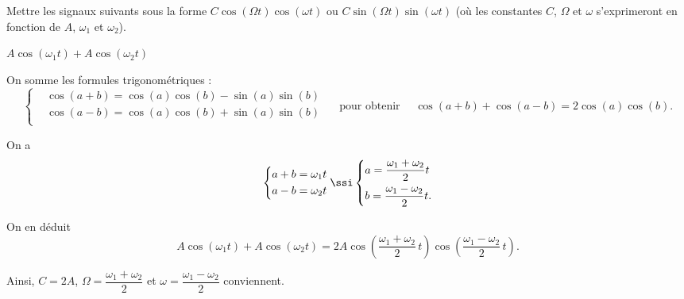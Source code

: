 Mettre les signaux suivants sous la forme $C\cos(\Omega t)\cos(\omega t)$ ou $C \sin(\Omega t)\sin(\omega t)$ (où les constantes $C$, $\Omega$ et $\omega$ s'exprimeront  en fonction de $A$, $\omega_1$ et $\omega_2$).



\begin{enonce}
$A\cos(\omega_1 t)+A\cos(\omega_2 t)$
\end{enonce}


\begin{corrige}
On somme les formules trigonométriques : 
\begin{equation*}
\left\{\begin{aligned}
&\cos(a+b)=\cos(a)\cos(b)-\sin(a)\sin(b)\\
&\cos(a-b)=\cos(a)\cos(b)+\sin(a)\sin(b)\\
\end{aligned}\right.
\quad\text{ pour obtenir }\quad\cos(a+b)+\cos(a-b)=2\cos(a)\cos(b).
\end{equation*}

On a 
\begin{equation*}
\left\{\begin{aligned}
&a+b=\omega_1t\\
&a-b=\omega_2t\\
\end{aligned}\right.\ssi
\left\{\begin{aligned}
&a=\dfrac{\omega_1+\omega_2}{2}t\\
&b=\dfrac{\omega_1-\omega_2}{2}t.
\end{aligned}
\right.
\end{equation*}

On en déduit 
\begin{equation*}
A\cos(\omega_1 t)+A\cos(\omega_2 t)=2A\cos\left(\dfrac{\omega_1+\omega_2}{2}\, t\right)\cos\left(\dfrac{\omega_1-\omega_2}{2}\, t\right).
\end{equation*}

Ainsi, $C=2A$, $\Omega=\dfrac{\omega_1+\omega_2}{2}$ et $\omega=\dfrac{\omega_1-\omega_2}{2}$ conviennent.
\end{corrige}





